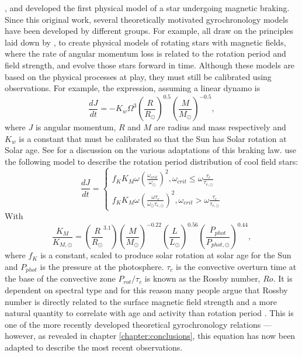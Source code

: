 \citet{Weber1967}, \citet{Mestel1987} and \citet{Kawaler1988} developed the first physical model of a star undergoing
magnetic braking.
Since this original work, several theoretically motivated gyrochronology
models have been developed by different groups.
For example, \citet{Collier-cameron1994, Reiners2012, Vansaders2013,
Epstein2014} all draw on the principles laid down by \citet{Kawaler1988}, to
create physical models of rotating stars with magnetic fields, where the rate
of angular momentum loss is related to the rotation period and field strength,
and evolve those stars forward in time.
Although these models are based on the physical processes at play, they must
still be calibrated using observations.
For example, the \citet{Kawaler1988} expression, assuming a linear dynamo is
\begin{equation}
\frac{dJ}{dt} = -K_w\Omega^3\left(\frac{R}{R_\odot}\right)^{0.5}
\left(\frac{M}{M_\odot}\right)^{-0.5},
\end{equation}
where $J$ is angular momentum, $R$ and $M$ are radius and mass respectively
and $K_w$ is a constant that must be calibrated so that the Sun has Solar
rotation at Solar age.
See \citet{Barnes2010b} for a discussion on the various adaptations of this
braking law.
\citet{Vansaders2013} use the following model to describe the rotation period
distribution of cool field stars:
\begin{equation}
\frac{dJ}{dt} = \left\{
                \begin{array}{ll}
                  f_K K_M \omega \left( \frac{\omega_{crit}}{\omega_\odot}
                  \right)^2, \omega_{crit} \leq \omega
                  \frac{\tau_{c}}{\tau_{c, \odot}} \\
                  f_K K_M \omega \left( \frac{\omega\tau_{c}}
                  {\omega_\odot\tau_{c, \odot}}
                  \right)^2, \omega_{crit} > \omega
                  \frac{\tau_{c}}{\tau_{c, \odot}}
                \end{array}
              \right.
\end{equation}
\label{eq:vansaders}
With
\begin{equation}
    \frac{K_M}{K_{M, \odot}} = \left(\frac{R}{R_\odot}^{3.1}\right)
    \left(\frac{M}{M_\odot}\right)^{-0.22}
    \left(\frac{L}{L_\odot}\right)^{0.56}
    \left(\frac{P_{phot}}{P_{phot, \odot}}\right)^{0.44},
\end{equation}
\label{eq:vansaders2}
where $f_K$ is a constant, scaled to produce solar rotation at solar age for
the Sun and $P_{phot}$ is the pressure at the photosphere.
$\tau_c$ is the convective overturn time at the base of the convective zone
$P_{rot}/\tau_c$ is known as the Rossby number, $Ro$.
It is dependent on spectral type and for this reason many people argue that
Rossby number is directly related to the surface magnetic field strength and a
more natural quantity to correlate with age and activity than rotation period
\citep[\eg][]{Vansaders2016} \citep[although this view is not universally
held --- see, \eg][]{Reiners2014}.
This is one of the more recently developed theoretical gyrochronology
relations --- however, as revealed in chapter \ref{chapter:conclusions}, this
equation has now been adapted to describe the most recent observations.

